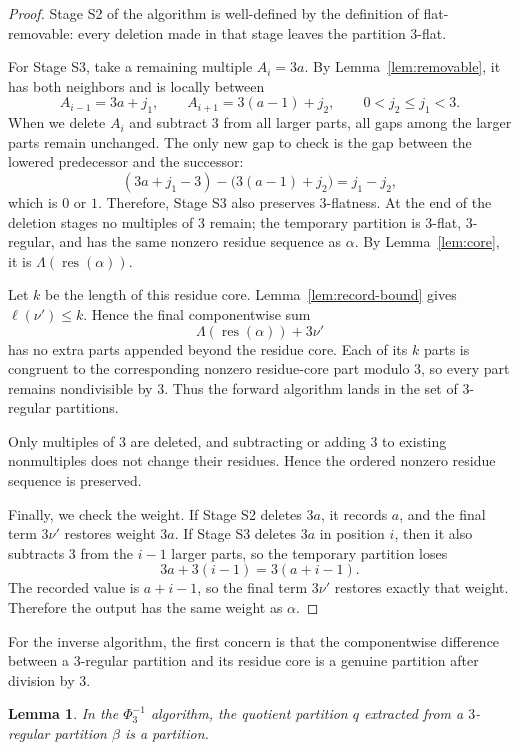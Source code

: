 \documentclass[11pt]{amsart}
\newtheorem{lemma}[theorem]{Lemma}
\theoremstyle{definition}
\theoremstyle{remark}
\newcommand{\res}{\operatorname{res}}
\begin{document}
\begin{proof}
Stage S2 of the algorithm is well-defined by the definition of flat-removable: every deletion made in that stage leaves the partition $3$-flat.

For Stage S3, take a remaining multiple $A_i=3a$.  By Lemma~\ref{lem:removable}, it has both neighbors and is locally between
\[
        A_{i-1}=3a+j_1,
        \qquad
        A_{i+1}=3(a-1)+j_2,
        \qquad
        0<j_2\le j_1<3.
\]
When we delete $A_i$ and subtract $3$ from all larger parts, all gaps among the larger parts remain unchanged.  The only new gap to check is the gap between the lowered predecessor and the successor:
\[
        (3a+j_1-3)-\bigl(3(a-1)+j_2\bigr)=j_1-j_2,
\]
which is $0$ or $1$.  Therefore, Stage S3 also preserves $3$-flatness.  At the end of the deletion stages no multiples of $3$ remain; the temporary partition is $3$-flat, $3$-regular, and has the same nonzero residue sequence as $\alpha$.  By Lemma~\ref{lem:core}, it is $\Lambda(\res(\alpha))$.

Let $k$ be the length of this residue core.  Lemma~\ref{lem:record-bound} gives $\ell(\nu')\le k$.  Hence the final componentwise sum
\[
        \Lambda(\res(\alpha))+3\nu'
\]
has no extra parts appended beyond the residue core.  Each of its $k$ parts is congruent to the corresponding nonzero residue-core part modulo $3$, so every part remains nondivisible by $3$.  Thus the forward algorithm lands in the set of $3$-regular partitions.

Only multiples of $3$ are deleted, and subtracting or adding $3$ to existing nonmultiples does not change their residues.  Hence the ordered nonzero residue sequence is preserved.

Finally, we check the weight.  If Stage S2 deletes $3a$, it records $a$, and the final term $3\nu'$ restores weight $3a$.  If Stage S3 deletes $3a$ in position $i$, then it also subtracts $3$ from the $i-1$ larger parts, so the temporary partition loses
\[
        3a+3(i-1)=3(a+i-1).
\]
The recorded value is $a+i-1$, so the final term $3\nu'$ restores exactly that weight.  Therefore the output has the same weight as $\alpha$.
\end{proof}

For the inverse algorithm, the first concern is that the componentwise difference between a $3$-regular partition and its residue core is a genuine partition after division by $3$.

\begin{lemma}\label{lem:extract}
In the $\Phi_3^{-1}$ algorithm, the quotient partition $q$ extracted from a $3$-regular partition $\beta$ is a partition.
\end{lemma}
\end{document}
